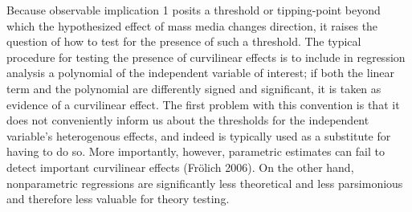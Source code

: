 \documentclass[11pt,article,oneside]{memoir}
\begin{document}
Because observable implication 1 posits a threshold or tipping-point
beyond which the hypothesized effect of mass media changes direction, it
raises the question of how to test for the presence of such a threshold.
The typical procedure for testing the presence of curvilinear effects is
to include in regression analysis a polynomial of the independent
variable of interest; if both the linear term and the polynomial are
differently signed and significant, it is taken as evidence of a
curvilinear effect. The first problem with this convention is that it
does not conveniently inform us about the thresholds for the independent
variable's heterogenous effects, and indeed is typically used as a
substitute for having to do so. More importantly, however, parametric
estimates can fail to detect important curvilinear effects (Fr{ö}lich
2006). On the other hand, nonparametric regressions are significantly
less theoretical and less parsimonious and therefore less valuable for
theory testing.
\end{document}
